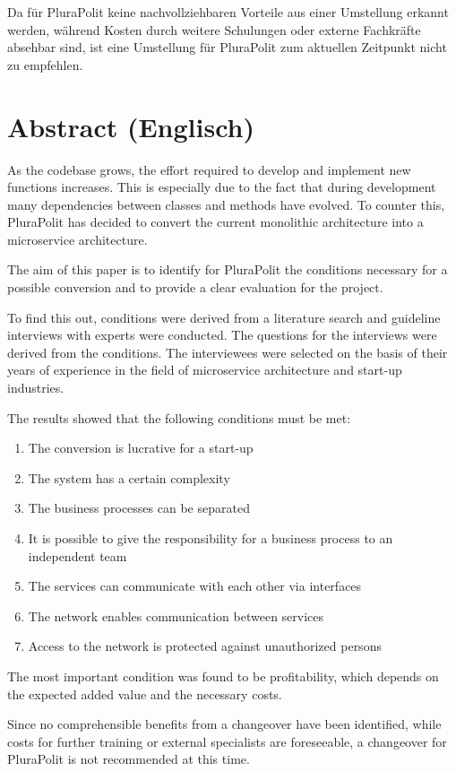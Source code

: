 Da für PluraPolit keine nachvollziehbaren Vorteile aus einer Umstellung erkannt werden, während Kosten durch weitere Schulungen oder externe Fachkräfte absehbar sind, ist eine Umstellung für PluraPolit zum aktuellen Zeitpunkt nicht zu empfehlen.

\newpage

\section*{Abstract (Englisch)}

As the codebase grows, the effort required to develop and implement new functions increases. This is especially due to the fact that during development many dependencies between classes and methods have evolved. To counter this, PluraPolit has decided to convert the current monolithic architecture into a microservice architecture.

The aim of this paper is to identify for PluraPolit the conditions necessary for a possible conversion and to provide a clear evaluation for the project.

To find this out, conditions were derived from a literature search and guideline interviews with experts were conducted. The questions for the interviews were derived from the conditions. The interviewees were selected on the basis of their years of experience in the field of microservice architecture and start-up industries.

The results showed that the following conditions must be met:
\begin{enumerate}
	\item The conversion is lucrative for a start-up
	\item The system has a certain complexity
	\item The business processes can be separated
	\item It is possible to give the responsibility for a business process to an independent team
	\item The services can communicate with each other via interfaces
	\item The network enables communication between services
	\item Access to the network is protected against unauthorized persons
\end{enumerate}

The most important condition was found to be profitability, which depends on the expected added value and the necessary costs.

Since no comprehensible benefits from a changeover have been identified, while costs for further training or external specialists are foreseeable, a changeover for PluraPolit is not recommended at this time.
